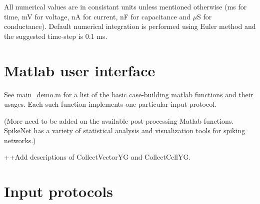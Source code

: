 \documentclass{article}
\begin{document}
All numerical values are in consistant units unless mentioned otherwise (ms for time, mV for voltage, nA for current, nF for capacitance and ${\mu}$S for conductance). 
Default numerical integration is performed using Euler method and the suggested time-step is 0.1 ms\cite{litwin2012slow}.



%	





\section{Matlab user interface}
\label{sec:matlab user interface}
See main\_demo.m for a list of the basic case-building matlab functions and their usages. Each such function implements one particular input protocol. 


(More need to be added on the available post-processing Matlab functions. SpikeNet has a variety of statistical analysis and visualization tools for spiking networks.)

++Add  descriptions of CollectVectorYG and CollectCellYG.

\section{Input protocols}
\label{sec:Input protocols}
\end{document}
